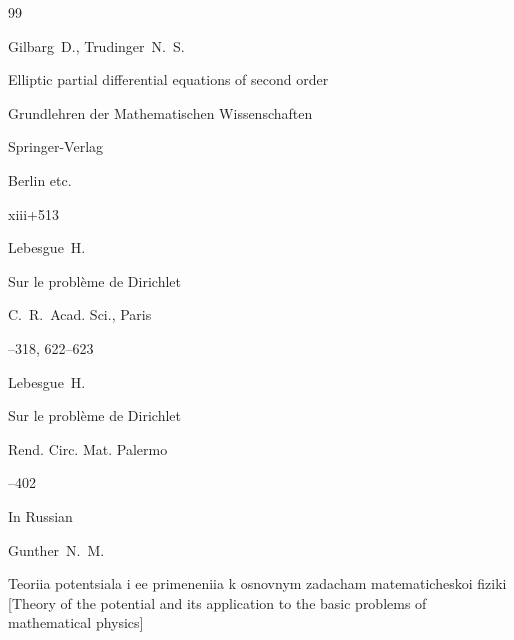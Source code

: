 \begin{thebibliography}{99}

\by Gilbarg~D., Trudinger~N.~S.

\book Elliptic partial differential equations of second order

\serial Grundlehren der Mathematischen Wissenschaften



\publ Springer-Verlag

\publaddr Berlin etc.

\totalpages xiii+513







\by Lebesgue~H.

\paper Sur le probl\`eme de Dirichlet

\jour C.~R.~Acad. Sci.\rm, Paris



--318, 622--623


\moreref

\by Lebesgue~H.

\paper Sur le probl\`eme de Dirichlet

\jour Rend. Circ. Mat. Palermo



--402







\lang In Russian

\by Gunther~N.~M.

\book Teoriia potentsiala i ee primeneniia k osnovnym zadacham matematicheskoi fiziki \rm [Theory of the potential and its application to the basic problems of mathematical physics]


\end{thebibliography}
